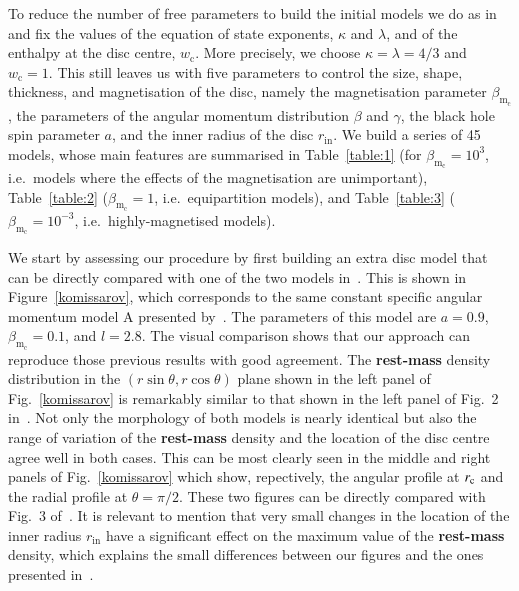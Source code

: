 \documentclass[]{aa}
\begin{document}
To reduce the number of free parameters to build the initial models we do as in~\citet{Komissarov:2006} and fix the values of the equation of state exponents, $\kappa$ and $\lambda$, and of the enthalpy at the disc centre, $w_{\mathrm{c}}$. More precisely, we choose $\kappa = \lambda = 4/3$ and $w_{\mathrm{c}} = 1$. This still leaves us with five parameters to control the size, shape, thickness, and magnetisation of the disc, namely the magnetisation parameter $\beta_{\mathrm{m}_{\mathrm{c}}}$, the parameters of the angular momentum distribution $\beta$ and $\gamma$, the black hole spin parameter $a$, and the inner radius of the disc $r_{\mathrm{in}}$. We build a series of 45 models, whose main features are summarised in Table~\ref{table:1} (for $\beta_{\mathrm{m}_{\mathrm{c}}} = 10^{3}$, i.e.~models where the effects of the magnetisation are unimportant), Table~\ref{table:2} ($\beta_{\mathrm{m}_{\mathrm{c}}} = 1$, i.e.~equipartition models), and Table~\ref{table:3} ($\beta_{\mathrm{m}_{\mathrm{c}}} = 10^{-3}$, i.e.~highly-magnetised models).

We start by assessing our procedure by first building an extra disc model that can be directly compared with one of the two models in~\citet{Komissarov:2006}. This is shown in Figure~\ref{komissarov}, which corresponds to the same constant specific angular momentum model A presented by~\citet{Komissarov:2006}. The parameters of this model are $a=0.9$, $\beta_{\mathrm{m}_{\mathrm{c}}}=0.1$, and $l=2.8$.
The visual comparison shows that our approach can reproduce those previous results with good agreement. The {\bf rest-mass} density distribution in the $(r\sin\theta,r\cos\theta)$ plane shown in the left panel of Fig.~\ref{komissarov} is remarkably similar to that shown in the left panel of Fig.~2 in~\citet{Komissarov:2006}. Not only the morphology of both models is nearly identical but also the range of variation of the {\bf rest-mass} density and the location of the disc centre agree well in both cases. This can be most clearly seen in the middle and right panels of Fig.~\ref{komissarov} which show, repectively, the angular profile at $r_{\rm c}$ and the radial profile at $\theta=\pi/2$. These two figures can be directly compared with Fig.~3 of~\citet{Komissarov:2006}. It is relevant to mention that very small changes in the location of the inner radius $r_{\mathrm{in}}$ have a significant effect on the maximum value of the {\bf rest-mass} density, which explains the small differences between our figures and the ones presented in~\citet{Komissarov:2006}.
\end{document}
